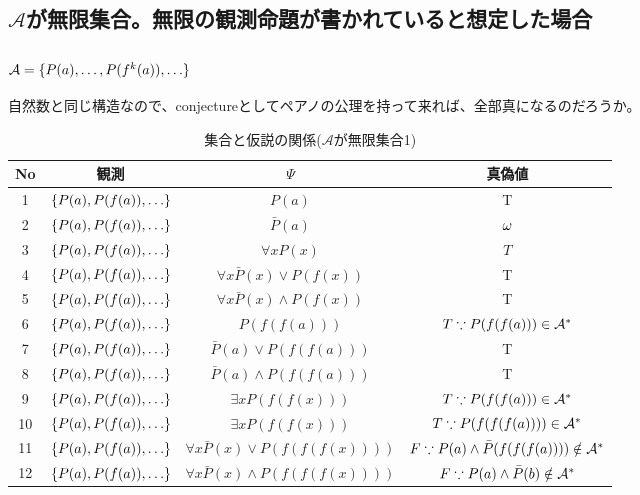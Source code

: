 \documentclass[10pt, oneside]{jarticle}   	%
\begin{document}
\newpage

\subsection{$\mathcal{A}$が無限集合。無限の観測命題が書かれていると想定した場合}
\subsubsection{$\mathcal{A}=\{{P(a), \dots, P(f^k(a)), \dots}\}$}
自然数と同じ構造なので、conjectureとしてペアノの公理を持って来れば、全部真になるのだろうか。

\begin{table}[htbp]
 \centering
 \begin{tabular}{|c|c|c|c|}\hline
   No & 観測 & $\Psi$ & 真偽値 \\ \hline
   1 & $\{{P(a), P(f(a)), \dots}\}$ & $P(a)$ & T \\ \hline
   2 & $\{{P(a), P(f(a)), \dots}\}$ & $\bar{P}(a)$ & $\omega$ \\ \hline %
   3 & $\{{P(a), P(f(a)), \dots}\}$ & $\forall x P(x)$ & $T $ \\ \hline
   4 & $\{{P(a), P(f(a)), \dots}\}$ & $\forall x \bar{P}(x) \lor P(f(x))$ & T \\ \hline
   5 & $\{{P(a), P(f(a)), \dots}\}$ & $\forall x \bar{P}(x) \land P(f(x))$ & T \\ \hline
   
   6 & $\{{P(a), P(f(a)), \dots}\}$ & $P(f(f(a)))$ & $T \because P(f(f(a))) \in \mathcal{A}^{*}$ \\ \hline
   7 & $\{{P(a), P(f(a)), \dots}\}$ & $\bar{P}(a)\lor P(f(f(a)))$ & T \\ \hline
   8 & $\{{P(a), P(f(a)), \dots}\}$ & $\bar{P}(a) \land P(f(f(a)))$ & T \\ \hline
   
   9 & $\{{P(a), P(f(a)), \dots}\}$ & $\exists x P(f(f(x)))$ & $T \because P(f(f(a))) \in \mathcal{A}^{*}$ \\ \hline
   10 & $\{{P(a), P(f(a)), \dots}\}$ & $\exists x P(f(f(x)))$ & $T \because P(f(f(f(a)))) \in \mathcal{A}^{*}$ \\ \hline
   
   11 & $\{{P(a), P(f(a)), \dots}\}$ & $\forall x \bar P(x) \lor P(f(f(f(x))))$ & $F \because P(a) \land \bar P(f(f(f(a)))) \notin \mathcal{A}^{*}$ \\ \hline
   12 & $\{{P(a), P(f(a)), \dots}\}$ & $\forall x \bar P(x) \land P(f(f(f(x))))$ & $F \because P(a) \land  \bar P(b) \notin \mathcal{A}^{*}$ \\ \hline
 \end{tabular}
 \caption{集合と仮説の関係($\mathcal{A}$が無限集合1)}
 \label{tab:ex0301}
\end{table}
\end{document}

